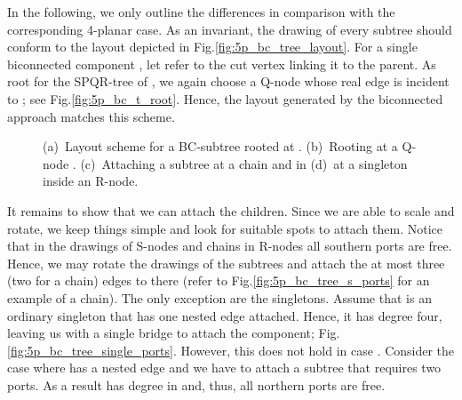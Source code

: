\documentclass[a4paper,twoside,11pt]{article}
\begin{document}
In the following, we only outline the differences in comparison with
the corresponding 4-planar case. As an invariant, the drawing of
every subtree should conform to the layout depicted in
Fig.\ref{fig:5p_bc_tree_layout}. For a single biconnected component
, let  refer to the cut vertex linking it to the parent. As
root for the SPQR-tree  of , we again choose a
Q-node  whose real edge is incident to ; see
Fig.\ref{fig:5p_bc_t_root}. Hence, the layout generated by the
biconnected approach matches this scheme.

\begin{figure}[htb]
    \centering
     \begin{minipage}[b]{.24\textwidth}
        \centering
        \subfloat[\label{fig:5p_bc_tree_layout}{}]
        {\texttt{[image: 5p\_bc]}}
    \end{minipage}
     \begin{minipage}[b]{.24\textwidth}
        \centering
        \subfloat[\label{fig:5p_bc_t_root}{}]
        {\texttt{[image: 5p\_bc]}}
    \end{minipage}
     \begin{minipage}[b]{.24\textwidth}
        \centering
        \subfloat[\label{fig:5p_bc_tree_s_ports}{}]
        {\texttt{[image: 5p\_bc]}}
    \end{minipage}
      \begin{minipage}[b]{.24\textwidth}
        \centering
        \subfloat[\label{fig:5p_bc_tree_single_ports}{}]
        {\texttt{[image: 5p\_bc]}}
    \end{minipage}
    \caption{
    (a)~Layout scheme for a BC-subtree rooted at .
    (b)~Rooting  at a Q-node .
    (c)~Attaching a subtree at a chain and in (d)~at a singleton inside an R-node.}
    \label{fig:5p_bc_tree}
\end{figure}

It remains to show that we can attach the children. Since we are
able to scale and rotate, we keep things simple and look for
suitable spots to attach them. Notice that in the drawings of
S-nodes and chains in R-nodes all southern ports are free. Hence, we
may rotate the drawings of the subtrees and attach the at most three
(two for a chain) edges to  there (refer to
Fig.\ref{fig:5p_bc_tree_s_ports} for an example of a chain). The
only exception are the singletons. Assume that  is an ordinary
singleton that has one nested edge attached. Hence, it has degree
four, leaving us with a single bridge to attach the component;
Fig.\ref{fig:5p_bc_tree_single_ports}. However, this does not hold
in case . Consider the case where  has a nested edge
and we have to attach a subtree that requires two ports. As a result
 has degree  in  and, thus, all northern ports are
free.
\end{document}
